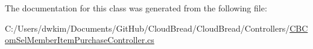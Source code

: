 The documentation for this class was generated from the following file\+:\begin{DoxyCompactItemize}
\item 
C\+:/\+Users/dwkim/\+Documents/\+Git\+Hub/\+Cloud\+Bread/\+Cloud\+Bread/\+Controllers/\hyperlink{_c_b_com_sel_member_item_purchase_controller_8cs}{C\+B\+Com\+Sel\+Member\+Item\+Purchase\+Controller.\+cs}\end{DoxyCompactItemize}
